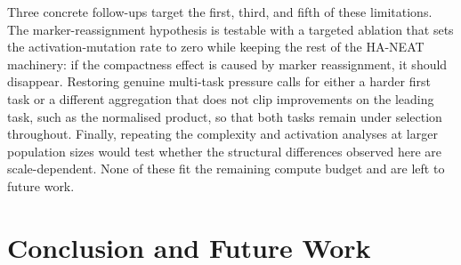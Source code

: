 \documentclass[12pt]{article}
\begin{document}
Three concrete follow-ups target the first, third, and fifth of these limitations.
The marker-reassignment hypothesis is testable with a targeted ablation that sets the activation-mutation rate to zero while keeping the rest of the HA-NEAT machinery: if the compactness effect is caused by marker reassignment, it should disappear.
Restoring genuine multi-task pressure calls for either a harder first task or a different aggregation that does not clip improvements on the leading task, such as the normalised product, so that both tasks remain under selection throughout.
Finally, repeating the complexity and activation analyses at larger population sizes would test whether the structural differences observed here are scale-dependent.
None of these fit the remaining compute budget and are left to future work.




\section{Conclusion and Future Work}
\label{sec:conclusion-and-future-work}


\clearpage \printbibliography
\end{document}
